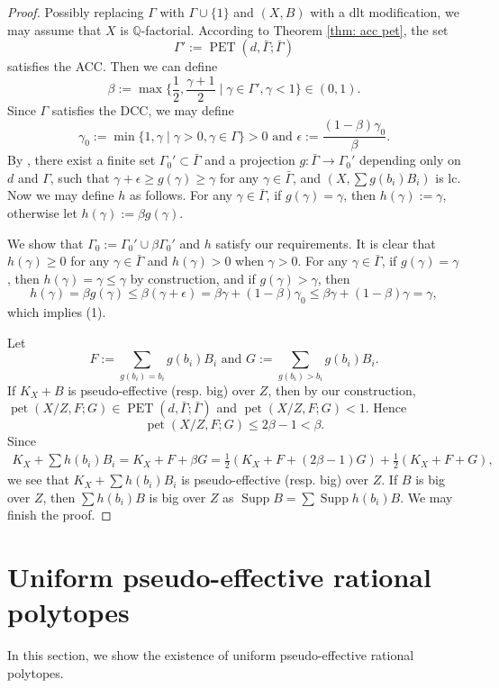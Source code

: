 \documentclass[11pt]{amsart}
\numberwithin{equation}{section}
\newcommand{\Qq}{\mathbb{Q}}
\newcommand{\pet}{\operatorname{pet}}
\newcommand{\PET}{\operatorname{PET}}
\newcommand{\Supp}{\operatorname{Supp}}
\newcommand{\Ii}{{\Gamma}}
\theoremstyle{definition}
\theoremstyle{definition}
\begin{document}
\begin{proof}
Possibly replacing $\Ii$ with $\Ii\cup\{1\}$ and $(X,B)$ with a dlt modification, we may assume that $X$ is $\Qq$-factorial. According to Theorem \ref{thm: acc pet}, the set
$$\Ii':=\PET(d,\bar\Ii;\bar\Ii)$$
satisfies the ACC. Then we can define
$$\beta:=\max\{\frac{1}{2},\frac{\gamma+1}{2}\mid\gamma\in\Ii',\gamma<1\}\in (0,1).$$
Since $\Ii$ satisfies the DCC, we may define
$$\gamma_0:=\min\{1,\gamma\mid\gamma>0,\gamma\in\Ii\}>0\text{ and }\epsilon:=\frac{(1-\beta)\gamma_0}{\beta}.$$
By \cite[Theorem 5.18]{HLS19}, there exist a finite set $\Ii_0'\subset\bar\Ii$  and a projection $g:\bar\Ii\rightarrow\Ii_0'$ depending only on $d$ and $\Ii$, such that $\gamma+\epsilon\geq g(\gamma)\geq\gamma$ for any $\gamma\in\bar\Ii$, and $(X,\sum g(b_i)B_i)$ is lc. Now we may define $h$ as follows. For any $\gamma\in\bar\Ii$, if $g(\gamma)=\gamma$, then $h(\gamma):=\gamma$, otherwise let $h(\gamma):=\beta g(\gamma)$.

We show that $\Ii_0:=\Ii_0'\cup\beta\Ii_0'$ and $h$ satisfy our requirements. It is clear that $h(\gamma)\geq 0$ for any $\gamma\in\bar\Ii$ and $h(\gamma)>0$ when $\gamma>0$. For any $\gamma\in\bar\Ii$, if $g(\gamma)=\gamma$, then $h(\gamma)=\gamma\leq\gamma$ by construction, and if $g(\gamma)>\gamma$, then 
$$h(\gamma)=\beta g(\gamma)\leq \beta(\gamma+\epsilon)=\beta\gamma+(1-\beta)\gamma_0\leq\beta\gamma+(1-\beta)\gamma=\gamma,$$
which implies (1). 

Let
$$F:=\sum_{g(b_i)=b_i}g(b_i)B_i \text{ and } G:=\sum_{g(b_i)>b_i}g(b_i)B_i.$$ 
If $K_X+B$ is pseudo-effective (resp. big) over $Z$, then by our construction, $\pet(X/Z,F;G)\in\PET(d,\bar\Ii;\bar\Ii)$ and $\pet(X/Z,F;G)<1$. Hence 
$$\pet(X/Z,F;G)\leq 2\beta-1<\beta.$$ 
Since
\begin{align*}
    K_X+\sum h(b_i)B_i%
    =K_X+F+\beta G
    =\frac{1}{2}(K_X+F+(2\beta-1)G)+\frac{1}{2}(K_X+F+G),
\end{align*}
we see that $K_X+\sum h(b_i)B_i$ is pseudo-effective (resp. big) over $Z$. If $B$ is big over $Z$, then $\sum h(b_i)B$ is big over $Z$ as $\Supp B=\sum\Supp h(b_i)B$. We may finish the proof.
\end{proof}

\section{Uniform pseudo-effective rational polytopes}\label{sec3}
In this section, we show the existence of uniform pseudo-effective rational polytopes.
\end{document}
